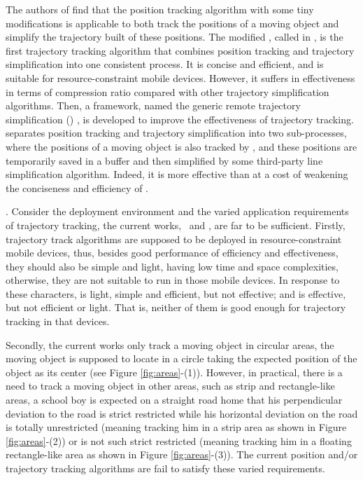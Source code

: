 The authors of \cite{Trajcevski:LDRH} find that the position tracking algorithm \ldr with some tiny modifications is applicable to both track the positions of a moving object and simplify the trajectory built of these positions. The modified \ldr,  called \ldrh in \cite{Lange:Tracking}, is the first trajectory tracking algorithm that combines position tracking and trajectory simplification into one consistent process. It is concise and efficient, and is suitable for resource-constraint mobile devices. However, it suffers in effectiveness in terms of compression ratio compared with other trajectory simplification algorithms.%
%
Then, a framework, named the generic remote trajectory simplification (\grts) \cite{Lange:GRTS,Lange:Tracking}, is developed to improve the effectiveness of trajectory tracking. \grts separates position tracking and trajectory simplification into two sub-processes, where the positions of a moving object is also tracked by \ldr, and these positions are temporarily saved in a buffer and then simplified by some third-party line simplification algorithm. Indeed, it is more effective than \ldrh at a cost of weakening the conciseness and efficiency of \ldrh.
%



. Consider the deployment environment and the varied application requirements of trajectory tracking, the current works, \ie~\ldrh and \grts, are far to be sufficient. Firstly, trajectory track algorithms are supposed to be deployed in resource-constraint mobile devices, thus, besides good performance of efficiency and effectiveness, they should also be simple and light, \ie having low time and space complexities, otherwise, they are not suitable to run in those mobile devices. In response to these characters, \ldrh is light, simple and efficient, but not effective; and \grts is effective, but not efficient or light. That is, neither of them is good enough for trajectory tracking in that devices.

Secondly, the current works only track a moving object in circular areas, \ie the moving object is supposed to locate in a circle taking the expected position of the object as its center (see Figure \ref{fig:areas}-(1)). However, in practical, there is a need to track a moving object in other areas, such as strip and rectangle-like areas, \eg a school boy is expected on a straight road home that his perpendicular deviation to the road is strict restricted while his horizontal deviation on the road is totally unrestricted (meaning tracking him in a strip area as shown in Figure \ref{fig:areas}-(2)) or is not such strict restricted (meaning tracking him in a floating rectangle-like area as shown in Figure \ref{fig:areas}-(3)). The current position and/or trajectory tracking algorithms are fail to satisfy these varied requirements.



